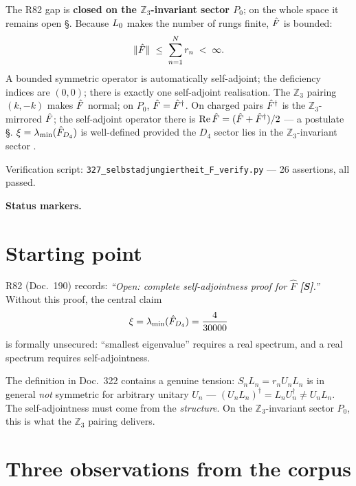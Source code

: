 \begin{tcolorbox}[ffgftbox, title={Main result \B\ on $P_0$, \S\ on all of $\Hcal$}]
  The R82 gap is \textbf{closed on the $\mathbb{Z}_3$-invariant sector $P_0$};
  on the whole space it remains open \S.
  Because $L_0$ makes the number of rungs finite, $\hat{F}$ is bounded:
  \[
    \|\hat{F}\| \;\le\; \sum_{n=1}^{N} r_n \;<\; \infty.
  \]
  A bounded symmetric operator is automatically self-adjoint;
  the deficiency indices are $(0,0)$; there is exactly one
  self-adjoint realisation.
  The $\mathbb{Z}_3$ pairing $(k,-k)$ makes $\hat{F}$ normal; on $P_0$,
  $\hat{F} = \hat{F}^\dagger$. On charged pairs $\hat{F}^\dagger$ is the
  $\mathbb{Z}_3$-mirrored $\hat{F}$; the self-adjoint operator there is
  $\mathrm{Re}\,\hat{F} = (\hat{F}+\hat{F}^\dagger)/2$ — a postulate \S.
  $\xi = \lambda_{\min}(\hat{F}_{D_4})$ is well-defined provided the
  $D_4$ sector lies in the $\mathbb{Z}_3$-invariant sector \B.
\end{tcolorbox}

Verification script: \texttt{327\_selbstadjungiertheit\_F\_verify.py} —
26 assertions, all passed.

\medskip\noindent\textbf{Status markers.}


\section{Starting point}

R82 (Doc.~190) records: \emph{``Open: complete self-adjointness proof
for $\hat{F}$ \textbf{[S]}.''}  Without this proof, the central claim
\[
  \xi = \lambda_{\min}(\hat{F}_{D_4}) = \frac{4}{30000}
\]
is formally unsecured: ``smallest eigenvalue'' requires a real spectrum,
and a real spectrum requires self-adjointness.

The definition in Doc.~322 contains a genuine tension:
$S_nL_n = r_nU_nL_n$ is in general \emph{not} symmetric for arbitrary
unitary $U_n$ — $(U_nL_n)^\dagger = L_nU_n^\dagger \neq U_nL_n$.
The self-adjointness must come from the \emph{structure}.
On the $\mathbb{Z}_3$-invariant sector $P_0$, this is what the $\mathbb{Z}_3$ pairing delivers.

\section{Three observations from the corpus}

